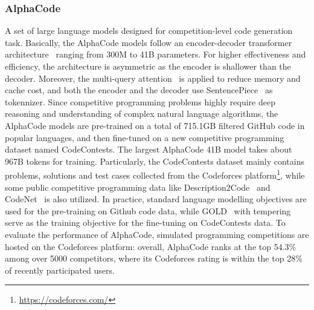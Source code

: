 \subsubsection{AlphaCode~\cite{li2022competition}}
A set of large language models designed for competition-level code generation task. Basically, the AlphaCode models follow an encoder-decoder transformer architecture~\cite{Transformers} ranging from 300M to 41B parameters. For higher effectiveness and efficiency, the architecture is asymmetric as the encoder is shallower than the decoder. Moreover, the multi-query attention~\cite{shazeer2019fast} is applied to reduce memory and cache cost, and both the encoder and the decoder use SentencePiece~\cite{kudo2018sentencepiece} as tokennizer. Since competitive programming problems highly require deep reasoning and understanding of complex natural language algorithms, the AlphaCode models are pre-trained on a total of 715.1GB filtered GitHub code in popular languages, and then fine-tuned on a new competitive programming dataset named CodeContests. The largest AlphaCode 41B model takes about 967B tokens for training. Particularly, the CodeContests dataset mainly contains problems, solutions and test cases collected from the Codeforces platform\footnote{\url{https://codeforces.com/}}, while some public competitive programming data like Description2Code~\cite{Caballero_Description2Code_Dataset_2016} and CodeNet~\cite{puri2021codenet} is also utilized. In practice, standard language modelling objectives are used for the pre-training on Github code data, while GOLD~\cite{pang2020text} with tempering~\cite{dabre2020softmax} serve as the training objective for the fine-tuning on CodeContests data. To evaluate the performance of AlphaCode, simulated programming competitions are hosted on the Codeforces platform: overall, AlphaCode ranks at the top 54.3\% among over 5000 competitors, where its Codeforces rating is within the top 28\% of recently participated users.
